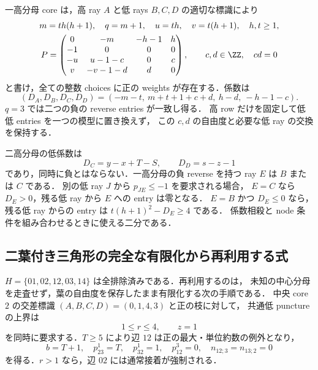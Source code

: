 一高分母 core は，高 ray $A$ と低 rays $B,C,D$ の適切な標識により
\[
\begin{gathered}
 m=th(h+1),\quad q=m+1,\quad u=th,\quad v=t(h+1),
 \quad h,t\geq1,\\
 P=\begin{pmatrix}
 0&-m&-h-1&h\\
 -1&0&0&0\\
 -u&u-1-c&0&c\\
 v&-v-1-d&d&0
 \end{pmatrix},\qquad c,d\in\ZZ,\quad cd=0
\end{gathered}
\]
と書け，全ての整数 choices に正の weights が存在する．係数は
\[
 (D_A,D_B,D_C,D_D)=(-m-t,\ m+t+1+c+d,\ h-d,\ -h-1-c).
\]
$q=3$ では二つの負の reverse entries が一致し得る．
高 row だけを固定して低低 entries を一つの模型に置き換えず，
この $c,d$ の自由度と必要な低 ray の交換を保持する．

二高分母の低係数は
\[
 D_C=y-x+T-S,\qquad D_D=s-z-1
\]
であり，同時に負とはならない．一高分母の負 reverse を持つ ray $E$ は $B$ または $C$ である．
別の低 ray $J$ から $p_{JE}\leq-1$ を要求される場合，
$E=C$ なら $D_E>0$，残る低 ray から $E$ への entry は零となる．
$E=B$ かつ $D_E\leq0$ なら，残る低 ray からの entry は
$t(h+1)^2-D_E\geq4$ である．
係数相殺と node 条件を組み合わせるときに使える二分である．

\subsection{二葉付き三角形の完全な有限化から再利用する式}
\label{ng16:two-leaf-certificate}

$H=\{01,02,12,03,14\}$ は全排除済みである．再利用するのは，
未知の中心分母を走査せず，葉の自由度を保存したまま有限化する次の手順である．
中央 core $2$ の交差標識 $(A,B,C,D)=(0,1,4,3)$ と正の枝に対して，
共通低 puncture の上界は
\[
 1\le r\le4,\qquad z=1
\]
を同時に要求する．$T\ge5$ により辺 $12$ は正の最大・単位約数の例外となり，
\[
 b=T+1,\quad p^1_{23}=T,\quad p^1_{32}=1,\quad
 p^3_{12}=0,\quad n_{12;3}=n_{13;2}=0
\]
を得る．$r>1$ なら，辺 $02$ には通常接着が強制される．

